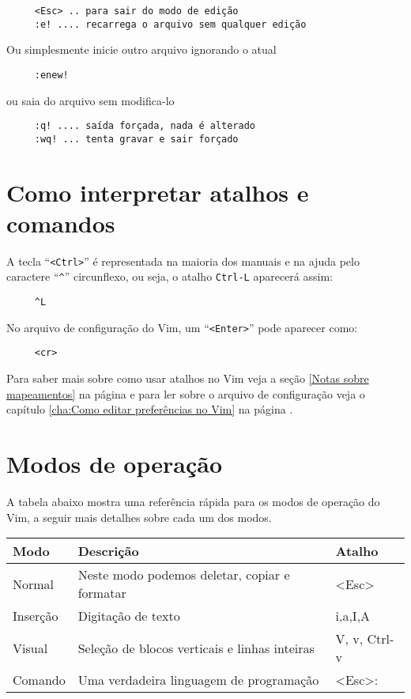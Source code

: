 \begin{verbatim}
     <Esc> .. para sair do modo de edição
     :e! .... recarrega o arquivo sem qualquer edição
\end{verbatim}

Ou simplesmente inicie outro arquivo ignorando o atual

\begin{verbatim}
     :enew!
\end{verbatim}

ou saia do arquivo sem modifica-lo

\begin{verbatim}
     :q! .... saída forçada, nada é alterado
     :wq! ... tenta gravar e sair forçado
\end{verbatim}

\section{Como interpretar atalhos e comandos}\label{Como interpretar atalhos e comandos}

A tecla ``\verb|<Ctrl>|'' é representada na maioria dos manuais e na ajuda
pelo caractere ``\verb|^|'' circunflexo, ou seja, o atalho \verb|Ctrl-L| aparecerá assim:

\begin{verbatim}
     ^L
\end{verbatim}

No arquivo de configuração do Vim, um ``\verb|<Enter>|'' pode aparecer como:

\begin{verbatim}
     <cr>
\end{verbatim}

Para saber mais sobre como usar atalhos no Vim veja a seção \ref{Notas sobre
mapeamentos} na página \pageref{Notas sobre mapeamentos} e para ler sobre o
arquivo de configuração veja o capítulo \ref{cha:Como editar preferências no Vim} na página
\pageref{cha:Como editar preferências no Vim}.


\section{Modos de operação}\label{Modos de operação}

A tabela abaixo mostra uma referência rápida para os modos de operação do Vim,
a seguir mais detalhes sobre cada um dos modos.


\begin{tabular}{|l|l|l|}
\hline
\textbf{Modo} & \textbf{Descrição} & \textbf{Atalho} \tabularnewline
\hline \hline
Normal & Neste modo podemos deletar, copiar e formatar & <Esc>\tabularnewline
\hline
Inserção & Digitação de texto & {}i,a,I,A\tabularnewline
\hline
Visual & Seleção de blocos verticais e linhas inteiras & {}V, v, Ctrl-v \tabularnewline
\hline
Comando & Uma verdadeira linguagem de programação & {}<Esc>:\tabularnewline
\hline
\end{tabular}



